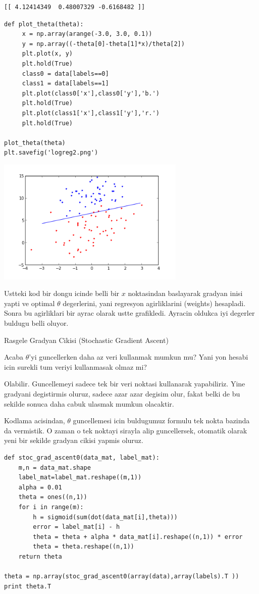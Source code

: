 \documentclass[12pt,fleqn]{article}\usepackage{../common}
\begin{document}
\begin{verbatim}
[[ 4.12414349  0.48007329 -0.6168482 ]]
\end{verbatim}


\begin{verbatim}
def plot_theta(theta):
     x = np.array(arange(-3.0, 3.0, 0.1))
     y = np.array((-theta[0]-theta[1]*x)/theta[2])
     plt.plot(x, y)
     plt.hold(True)
     class0 = data[labels==0]
     class1 = data[labels==1]
     plt.plot(class0['x'],class0['y'],'b.')
     plt.hold(True)
     plt.plot(class1['x'],class1['y'],'r.')
     plt.hold(True)

plot_theta(theta)
plt.savefig('logreg2.png')
\end{verbatim}

\includegraphics[height=6cm]{logreg2.png}

Ustteki kod bir dongu icinde belli bir $x$ noktasindan baslayarak gradyan
inisi yapti ve optimal $\theta$ degerlerini, yani regresyon agirliklarini
(weights) hesapladi. Sonra bu agirliklari bir ayrac olarak ustte grafikledi. 
Ayracin oldukca iyi degerler buldugu belli oluyor.

Rasgele Gradyan Cikisi (Stochastic Gradient Ascent)

Acaba $\theta$'yi guncellerken daha az veri kullanmak mumkun mu? Yani
yon hesabi icin surekli tum veriyi kullanmasak olmaz mi?

Olabilir. Guncellemeyi sadece tek bir veri noktasi kullanarak
yapabiliriz. Yine gradyani degistirmis oluruz, sadece azar azar
degisim olur, fakat belki de bu sekilde sonuca daha cabuk ulasmak
mumkun olacaktir.

Kodlama acisindan, $\theta$ guncellemesi icin buldugumuz formulu tek
nokta bazinda da vermistik.  O zaman o tek noktayi sirayla alip
guncellersek, otomatik olarak yeni bir sekilde gradyan cikisi yapmis
oluruz.

\begin{verbatim}
def stoc_grad_ascent0(data_mat, label_mat):
    m,n = data_mat.shape
    label_mat=label_mat.reshape((m,1))
    alpha = 0.01
    theta = ones((n,1))
    for i in range(m):
        h = sigmoid(sum(dot(data_mat[i],theta)))
        error = label_mat[i] - h
        theta = theta + alpha * data_mat[i].reshape((n,1)) * error
        theta = theta.reshape((n,1))
    return theta

theta = np.array(stoc_grad_ascent0(array(data),array(labels).T ))
print theta.T
\end{verbatim}
\end{document}
